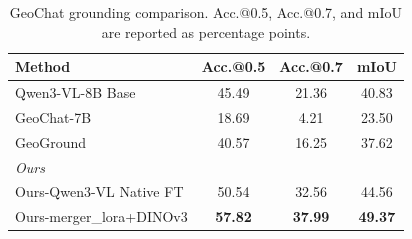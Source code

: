 \begin{table}[t]
  \caption{GeoChat grounding comparison. Acc.@0.5, Acc.@0.7, and mIoU are reported as percentage points.}
  \label{tab:GeoChat_grounding}
  \vspace{5pt}
  \centering
  \scriptsize
  \setlength{\tabcolsep}{6pt}
  \renewcommand{\arraystretch}{1.08}
  \begin{tabular}{lccc}
    \toprule
    Method & Acc.@0.5 & Acc.@0.7 & mIoU \\
    \midrule
    Qwen3-VL-8B Base                 & 45.49          & 21.36          & 40.83          \\
    GeoChat-7B                       & 18.69          & 4.21           & 23.50          \\
    GeoGround                        & 40.57          & 16.25          & 37.62          \\
    \midrule
    \multicolumn{4}{l}{\textit{Ours}} \\
    Ours-Qwen3-VL Native FT           & 50.54          & 32.56          & 44.56          \\
    Ours-merger\_lora+DINOv3          & \textbf{57.82} & \textbf{37.99} & \textbf{49.37} \\
    \bottomrule
  \end{tabular}
\end{table}
